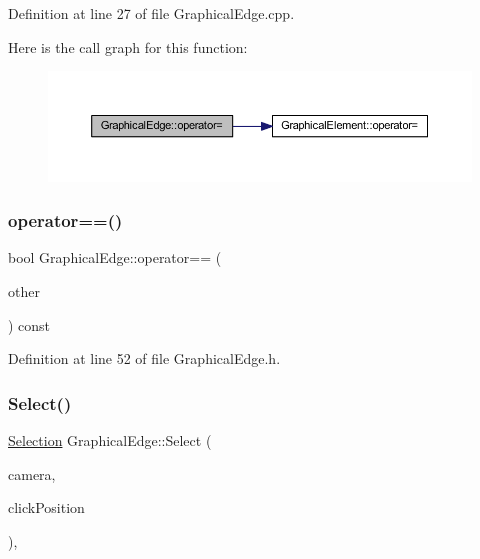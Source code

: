 Definition at line 27 of file Graphical\+Edge.\+cpp.

Here is the call graph for this function\+:
\nopagebreak
\begin{figure}[H]
\begin{center}
\leavevmode
\includegraphics[width=350pt]{class_graphical_edge_ad590b20ea1c1cb30a15850a36f82a2c9_cgraph}
\end{center}
\end{figure}
\mbox{\label{class_graphical_edge_aa03597dca35cc2f08c8a1894657546d8}} 
\subsubsection{\texorpdfstring{operator==()}{operator==()}}
{\footnotesize\ttfamily bool Graphical\+Edge\+::operator== (\begin{DoxyParamCaption}\item[{const \hyperlink{class_graphical_edge}{Graphical\+Edge} \&}]{other }\end{DoxyParamCaption}) const\hspace{0.3cm}{\ttfamily [inline]}}



Definition at line 52 of file Graphical\+Edge.\+h.

\mbox{\label{class_graphical_edge_aa2dbc33d5177ce3aad84f39ba97921de}} 
\subsubsection{\texorpdfstring{Select()}{Select()}}
{\footnotesize\ttfamily \hyperlink{struct_selection}{Selection} Graphical\+Edge\+::\+Select (\begin{DoxyParamCaption}\item[{const wx\+Affine\+Matrix2D \&}]{camera,  }\item[{wx\+Point2\+D\+Double}]{click\+Position }\end{DoxyParamCaption})\hspace{0.3cm}{\ttfamily [override]}, {\ttfamily [virtual]}}



